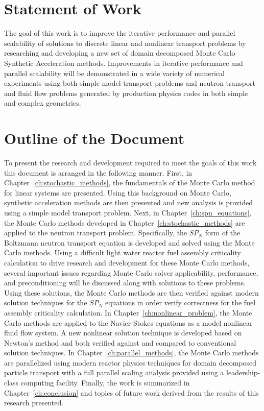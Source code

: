 \section{Statement of Work}
\label{sec:statement_of_work}

The goal of this work is to improve the iterative performance and
parallel scalability of solutions to discrete linear and nonlinear
transport problems by researching and developing a new set of domain
decomposed Monte Carlo Synthetic Acceleration methods. Improvements in
iterative performance and parallel scalability will be demonstrated in
a wide variety of numerical experiments using both simple model
transport problems and neutron transport and fluid flow problems
generated by production physics codes in both simple and complex
geometries.

\section{Outline of the Document}
\label{sec:doc_outline}

To present the research and development required to meet the goals of
this work this document is arranged in the following manner. First, in
Chapter~\ref{ch:stochastic_methods}, the fundamentals of the Monte
Carlo method for linear systems are presented. Using this background
on Monte Carlo, synthetic acceleration methods are then presented and
new analysis is provided using a simple model transport problem. Next,
in Chapter~\ref{ch:spn_equations}, the Monte Carlo methods developed
in Chapter~\ref{ch:stochastic_methods} are applied to the neutron
transport problem. Specifically, the $SP_N$ form of the Boltzmann
neutron transport equation is developed and solved using the Monte
Carlo methods. Using a difficult light water reactor fuel assembly
criticality calculation to drive research and development for these
Monte Carlo methods, several important issues regarding Monte Carlo
solver applicability, performance, and preconditioning will be
discussed along with solutions to these problems. Using these
solutions, the Monte Carlo methods are then verified against modern
solution techniques for the $SP_N$ equations in order verify
correctness for the fuel assembly criticality calculation. In
Chapter~\ref{ch:nonlinear_problem}, the Monte Carlo methods are
applied to the Navier-Stokes equations as a model nonlinear fluid flow
system. A new nonlinear solution technique is developed based on
Newton's method and both verified against and compared to conventional
solution techniques. In Chapter~\ref{ch:parallel_methods}, the Monte
Carlo methods are parallelized using modern reactor physics techniques
for domain decomposed particle transport with a full parallel scaling
analysis provided using a leadership-class computing
facility. Finally, the work is summarized in
Chapter~\ref{ch:conclusion} and topics of future work derived from the
results of this research presented.

